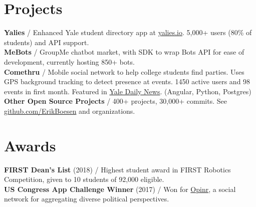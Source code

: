 \documentclass[10pt, a4paper]{article}
\newcommand{\years}[1]{\marginnote{\scriptsize #1}}
\begin{document}
\section*{Projects}
\textbf{Yalies} / Enhanced Yale student directory app at \href{https://yalies.io}{yalies.io}. 5,000+ users (80\% of students) and API support.\\
\textbf{MeBots} / GroupMe chatbot market, with SDK to wrap Bots API for ease of development, currently hosting 850+ bots.\\
\textbf{Comethru} / Mobile social network to help college students find parties. Uses GPS background tracking to detect presence at events. 1450 active users and 98 events in first month. Featured in \href{https://yaledailynews.com/blog/2020/01/22/new-events-app-comethru-launches}{Yale Daily News}. (Angular, Python, Postgres)\\
\textbf{Other Open Source Projects} / 400+ projects, 30,000+ commits. See \href{https://github.com/ErikBoesen}{github.com/ErikBoesen} and organizations.\\

\vspace{-7mm}
\section*{Awards}
\textbf{FIRST Dean's List} (2018) / Highest student award in FIRST Robotics Competition, given to 10 students of 92,000 eligible.\\
\textbf{US Congress App Challenge Winner} (2017) / Won for \href{http://opinr.me}{Opinr}, a social network for aggregating diverse political perspectives.\\
\end{document}
